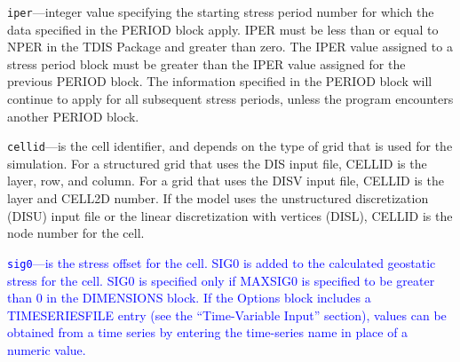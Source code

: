 \begin{description}
\item \texttt{iper}---integer value specifying the starting stress period number for which the data specified in the PERIOD block apply.  IPER must be less than or equal to NPER in the TDIS Package and greater than zero.  The IPER value assigned to a stress period block must be greater than the IPER value assigned for the previous PERIOD block.  The information specified in the PERIOD block will continue to apply for all subsequent stress periods, unless the program encounters another PERIOD block.

\item \texttt{cellid}---is the cell identifier, and depends on the type of grid that is used for the simulation.  For a structured grid that uses the DIS input file, CELLID is the layer, row, and column.   For a grid that uses the DISV input file, CELLID is the layer and CELL2D number.  If the model uses the unstructured discretization (DISU) input file or the linear discretization with vertices (DISL), CELLID is the node number for the cell.

\item \textcolor{blue}{\texttt{sig0}---is the stress offset for the cell. SIG0 is added to the calculated geostatic stress for the cell. SIG0 is specified only if MAXSIG0 is specified to be greater than 0 in the DIMENSIONS block. If the Options block includes a TIMESERIESFILE entry (see the ``Time-Variable Input'' section), values can be obtained from a time series by entering the time-series name in place of a numeric value.}

\end{description}

